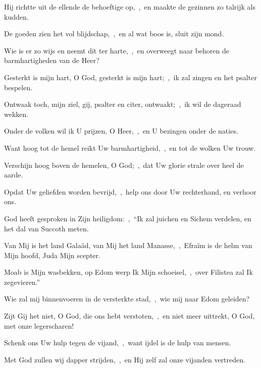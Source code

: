 \documentclass[12pt,twoside,a5paper]{article}
\begin{document}
\begin{halfparskip}
  Hij richtte uit de ellende de behoeftige op,~\sep\ en maakte de gezinnen zo talrijk als kudden.

  De goeden zien het vol blijdschap,~\sep\ en al wat boos is, sluit zijn mond.

  Wie is er zo wijs en neemt dit ter harte,~\sep\ en overweegt naar behoren de barmhartigheden van de Heer?

   Gesterkt is mijn hart, O God, gesterkt is mijn hart;~\sep\ ik zal zingen en het psalter bespelen.

  Ontwaak toch, mijn ziel, gij, psalter en citer, ontwaakt;~\sep\ ik wil de dageraad wekken.

  Onder de volken wil ik U prijzen, O Heer,~\sep\ en U bezingen onder de naties.

  Want hoog tot de hemel reikt Uw barmhartigheid,~\sep\ en tot de wolken Uw trouw.

  Verschijn hoog boven de hemelen, O God;~\sep\ dat Uw glorie strale over heel de aarde.

  Opdat Uw geliefden worden bevrijd,~\sep\ help ons door Uw rechterhand, en verhoor ons.

  God heeft gesproken in Zijn heiligdom:~\sep\ ``Ik zal juichen en Sichem verdelen, en het dal van Succoth meten.

  Van Mij is het land Galaäd, van Mij het land Manasse,~\sep\ Efraïm is de helm van Mijn hoofd, Juda Mijn scepter.

  Moab is Mijn wasbekken, op Edom werp Ik Mijn schoeisel,~\sep\ over Filistea zal Ik zegevieren.''

  Wie zal mij binnenvoeren in de versterkte stad,~\sep\ wie mij naar Edom geleiden?

  Zijt Gij het niet, O God, die ons hebt verstoten,~\sep\ en niet meer uittrekt, O God, met onze legerscharen!

  Schenk ons Uw hulp tegen de vijand,~\sep\ want ijdel is de hulp van mensen.

  Met God zullen wij dapper strijden,~\sep\ en Hij zelf zal onze vijanden vertreden.
\end{halfparskip}

\end{document}

